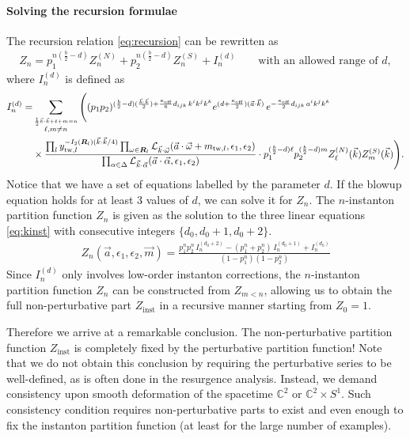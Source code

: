 \documentclass[letterpaper, 11pt]{article}
\newcommand{\nn}{\nonumber}
\def\IC{\mathbb{C}}
\def\CL{{\cal L}}
\def\a{\alpha}
\def\e{\epsilon}
\def\k{\kappa}
\def\w{\omega}
\def\D{\Delta}
\begin{document}
\paragraph{Solving the recursion formulae}
The recursion relation \eqref{eq:recursion} can be rewritten as 
\begin{align}
  \label{eq:kinst}
  Z_n = p_1^{n(\frac{b}{2}-d)}Z^{(N)}_{n}  + p_2^{n(\frac{b}{2}-d)}  Z^{(S)}_n  + I_n^{(d)} \qquad \text{with an allowed range of $d$},
\end{align}
where $I_{n}^{(d)}$ is defined as
\begin{align} \label{eq:Ind}
  I_{n}^{(d)} = &\sum_{\stackrel{\frac{1}{2}\vec{k}\cdot\vec{k} + \ell + m = n}{\ell, m \neq n}}  
  \Bigg( (p_1p_2)^{(\frac{b}{2} -d) (\frac{\vec{k}\cdot\vec{k}}{2}) +\frac{\k_\text{eff}}{6}d_{ijk}\,k^ik^jk^k} e^{(d+\frac{\k_\text{eff}}{2})(\vec{a}\cdot\vec{k})}\,
 e^{-\frac{\k_\text{eff}}{2}d_{ijk}\,a^ik^jk^k}  \\& 
 \times    \frac{\prod_{l} y_{\text{tw}, l}^{-I_2(\boldsymbol{R}_l)(\vec{k}\cdot\vec{k}/4)} \prod_{\w \in \boldsymbol{R}_l} \CL_{\vec{k}\cdot\vec{\w}}(\vec{a}\cdot \vec{\w} + m_{\text{tw},l}, \e_1,\e_2)}{ \prod_{\a \in \D} \CL_{\vec{k} \cdot \vec{\a}} (\vec{a}\cdot\vec{\alpha}, \epsilon_1, \epsilon_2)}
 \cdot p_1^{(\frac{b}{2}-d)\ell}p_2^{(\frac{b}{2}-d)m} Z^{(N)}_{\ell}(\vec{k})  Z^{(S)}_m (\vec{k}) \Bigg) . \nn
\end{align}
Notice that we have a set of equations labelled by the parameter $d$. If the blowup equation holds for at least 3 values of $d$, we can solve it for $Z_n$. 
The $n$-instanton partition function $Z_n$ is given as the solution to the three linear equations \eqref{eq:kinst} with consecutive integers $\{d_0, d_0+1, d_0+2\}$.
\begin{align}
  Z_n(\vec{a},\e_1,\e_2, \vec{m})=\frac{p_1^n p_2^n \,I_{n}^{(d_0+2)}-(p_1^n+p_2^n)\,I_{n}^{(d_0+1)}+I_{n}^{(d_0)}}{(1-p_1^n)(1-p_2^n)}
\end{align}
Since $I_n^{(d)}$ only involves low-order instanton corrections, the $n$-instanton partition function $Z_n$ can be constructed from $Z_{m<n}$, allowing us to obtain the full non-perturbative part $Z_\text{inst}$ in a recursive manner starting from $Z_0 = 1$. 

Therefore we arrive at a remarkable conclusion. The non-perturbative partition function $Z_\text{inst}$ is completely fixed by the perturbative partition function! Note that we do not obtain this conclusion by requiring the perturbative series to be well-defined, as is often done in the resurgence analysis. Instead, we demand consistency upon smooth deformation of the spacetime $\IC^2$ or $\IC^2 \times S^1$. Such consistency condition requires non-perturbative parts to exist and even enough to fix the instanton partition function (at least for the large number of examples). 
\end{document}
